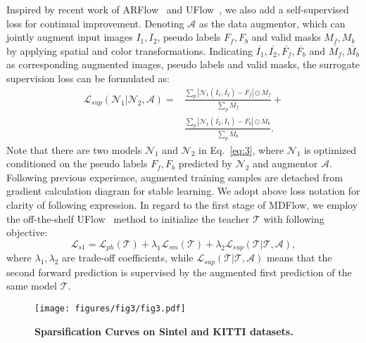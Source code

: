 \documentclass[lettersize,journal]{IEEEtran}
\begin{document}
Inspired by recent work of ARFlow~\cite{Liu_2020_CVPR} and UFlow~\cite{10.1007/978-3-030-58536-5_33}, we also add a self-supervised loss for continual improvement. Denoting $\mathcal{A}$ as the data augmentor, which can jointly augment input images $I_1, I_2$, pseudo labels $F_f, F_b$ and valid masks $M_f, M_b$ by applying spatial and color transformations. Indicating $\overline{I_1}, \overline{I_2}, \overline{F_f}, \overline{F_b}$ and $\overline{M_f}, \overline{M_b}$ as corresponding augmented images, pseudo labels and valid masks, the surrogate supervision loss can be formulated as:
\begin{equation}
	\begin{split}
		\mathcal{L}_{sup}(\mathcal{N}_1 | \mathcal{N}_2, \mathcal{A})= & \frac{\sum_{p}{|\mathcal{N}_1(\overline{I_1}, \overline{I_2}) - \overline{F_f}| \odot \overline{M_f}}}{\sum_{p}{\overline{M_f}}}+ \\
		& \frac{\sum_{p}{|\mathcal{N}_1(\overline{I_2}, \overline{I_1}) - \overline{F_b}| \odot \overline{M_b}}}{\sum_{p}{\overline{M_b}}}.
	\end{split}
	\label{eq:3}
\end{equation}
Note that there are two models $\mathcal{N}_1$ and $\mathcal{N}_2$ in Eq.~\ref{eq:3}, where $\mathcal{N}_1$ is optimized conditioned on the pseudo labels $F_f, F_b$ predicted by $\mathcal{N}_2$ and augmentor $\mathcal{A}$. Following previous experience, augmented training samples are detached from gradient calculation diagram for stable learning. We adopt above loss notation for clarity of following expression. In regard to the first stage of MDFlow, we employ the off-the-shelf UFlow~\cite{10.1007/978-3-030-58536-5_33} method to initialize the teacher $\mathcal{T}$ with following objective:
\begin{equation}
	\mathcal{L}_{s1} = \mathcal{L}_{ph}(\mathcal{T}) + \lambda_1 \mathcal{L}_{sm} (\mathcal{T})+ \lambda_2 \mathcal{L}_{sup}(\mathcal{T} | \mathcal{T}, \mathcal{A}),
	\label{eq:4}
\end{equation}
where $\lambda_1, \lambda_2$ are trade-off coefficients, while $\mathcal{L}_{sup}(\mathcal{T} | \mathcal{T}, \mathcal{A})$ means that the second forward prediction is supervised by the augmented first prediction of the same model $\mathcal{T}$.

\begin{figure}[t]
	\centering
	\texttt{[image: figures/fig3/fig3.pdf]}
	\caption{\textbf{Sparsification Curves on Sintel and KITTI datasets.}}
	\label{fig:3}
\end{figure}
\end{document}

